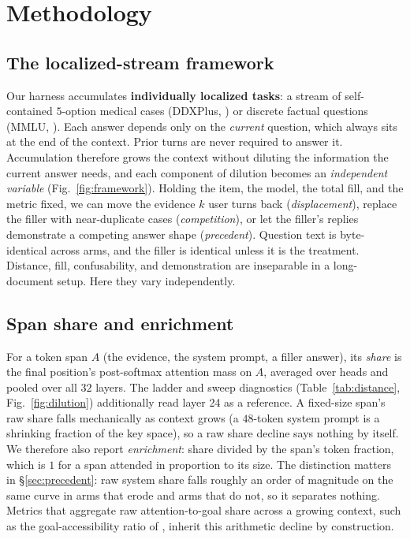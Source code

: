 \documentclass{article}
\begin{document}
\section{Methodology}
\label{sec:method}

\subsection{The localized-stream framework}
\label{sec:framework}

Our harness accumulates \textbf{individually localized tasks}: a stream of self-contained
$5$-option medical cases (DDXPlus, \citealp{tchango2022ddxplus}) or discrete factual questions
(MMLU, \citealp{hendrycks2021mmlu}). Each answer depends only on the \emph{current} question,
which always sits at the end of the context. Prior turns are never required to answer it.
Accumulation therefore grows the context without diluting the information the current answer
needs, and each component of dilution becomes an \emph{independent variable}
(Fig.~\ref{fig:framework}). Holding the item, the model, the total fill, and the metric fixed,
we can move the evidence $k$ user turns back (\emph{displacement}), replace the filler with
near-duplicate cases (\emph{competition}), or let the filler's replies demonstrate a competing
answer shape (\emph{precedent}). Question text is byte-identical across arms, and the filler is
identical unless it is the treatment. Distance, fill, confusability, and
demonstration are inseparable in a long-document setup. Here they vary independently.

\subsection{Span share and enrichment}
\label{sec:share}

For a token span $A$ (the evidence, the system prompt, a filler answer), its \emph{share} is the
final position's post-softmax attention mass on $A$, averaged over heads and pooled over all
$32$ layers. The ladder and sweep diagnostics (Table~\ref{tab:distance}, Fig.~\ref{fig:dilution})
additionally read layer 24 as a reference. A fixed-size span's raw share falls
mechanically as context grows (a $48$-token system prompt is a shrinking fraction of the key
space), so a raw share decline says nothing by itself. We therefore also report
\emph{enrichment}: share divided by the span's token fraction, which is $1$ for a span attended
in proportion to its size. The distinction matters in \S\ref{sec:precedent}: raw system share
falls roughly an order of magnitude on the same curve in arms that erode and arms that do not,
so it separates nothing. Metrics that aggregate raw attention-to-goal share across a growing context,
such as the goal-accessibility ratio of \citet{dongre2026attentioncloses}, inherit this
arithmetic decline by construction.
\end{document}
